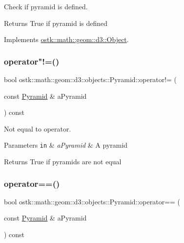 Check if pyramid is defined. 

\begin{DoxyReturn}{Returns}
True if pyramid is defined 
\end{DoxyReturn}


Implements \hyperlink{classostk_1_1math_1_1geom_1_1d3_1_1_object_a271a1964cd208be85ce9a0a429395ad8}{ostk\+::math\+::geom\+::d3\+::\+Object}.

\mbox{\label{classostk_1_1math_1_1geom_1_1d3_1_1objects_1_1_pyramid_a413a5250a7dc5530f7e4321ca94648f8}} 
\subsubsection{\texorpdfstring{operator"!=()}{operator!=()}}
{\footnotesize\ttfamily bool ostk\+::math\+::geom\+::d3\+::objects\+::\+Pyramid\+::operator!= (\begin{DoxyParamCaption}\item[{const \hyperlink{classostk_1_1math_1_1geom_1_1d3_1_1objects_1_1_pyramid}{Pyramid} \&}]{a\+Pyramid }\end{DoxyParamCaption}) const}



Not equal to operator. 


\begin{DoxyParams}[1]{Parameters}
\mbox{\tt in}  & {\em a\+Pyramid} & A pyramid \\
\hline
\end{DoxyParams}
\begin{DoxyReturn}{Returns}
True if pyramids are not equal 
\end{DoxyReturn}
\mbox{\label{classostk_1_1math_1_1geom_1_1d3_1_1objects_1_1_pyramid_a9385744e89111818c847fb440ae66ba4}} 
\subsubsection{\texorpdfstring{operator==()}{operator==()}}
{\footnotesize\ttfamily bool ostk\+::math\+::geom\+::d3\+::objects\+::\+Pyramid\+::operator== (\begin{DoxyParamCaption}\item[{const \hyperlink{classostk_1_1math_1_1geom_1_1d3_1_1objects_1_1_pyramid}{Pyramid} \&}]{a\+Pyramid }\end{DoxyParamCaption}) const}



